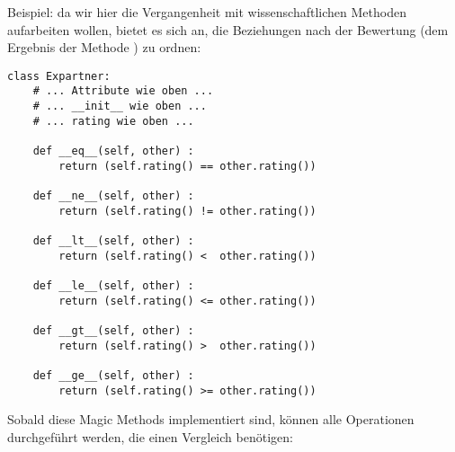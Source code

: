 Beispiel: da wir hier die Vergangenheit mit wissenschaftlichen Methoden aufarbeiten wollen, bietet es sich an, die Beziehungen nach der Bewertung (dem Ergebnis der Methode ) zu ordnen:

\begin{codebox}
\begin{verbatim}
class Expartner:
    # ... Attribute wie oben ...
    # ... __init__ wie oben ...
    # ... rating wie oben ...
    
    def __eq__(self, other) :
        return (self.rating() == other.rating())
    
    def __ne__(self, other) :
        return (self.rating() != other.rating())
    
    def __lt__(self, other) :
        return (self.rating() <  other.rating())
    
    def __le__(self, other) :
        return (self.rating() <= other.rating())
    
    def __gt__(self, other) :
        return (self.rating() >  other.rating())
    
    def __ge__(self, other) :
        return (self.rating() >= other.rating())
\end{verbatim}
\end{codebox}

Sobald diese Magic Methods implementiert sind, können alle Operationen durchgeführt werden, die einen Vergleich benötigen:

